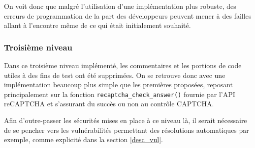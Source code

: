 On voit donc que malgré l'utilisation d'une implémentation plus robuste, des erreurs de programmation de la part des développeurs peuvent mener à des failles allant à l'encontre même de ce qui était initialement souhaité. 

\subsubsection{Troisième niveau}

Dans ce troisième niveau implémenté, les commentaires et les portions de code utiles à des fins de test ont été supprimées. On se retrouve donc avec une implémentation beaucoup plus simple que les premières proposées, reposant principalement sur la fonction \texttt{recaptcha\_check\_answer()} fournie par l'API reCAPTCHA et s'assurant du succès ou non au contrôle CAPTCHA.

Afin d'outre-passer les sécurités mises en place à ce niveau là, il serait nécessaire de se pencher vers les vulnérabilités permettant des résolutions automatiques par exemple, comme explicité dans la section \ref{desc_vul}.






\clearpage